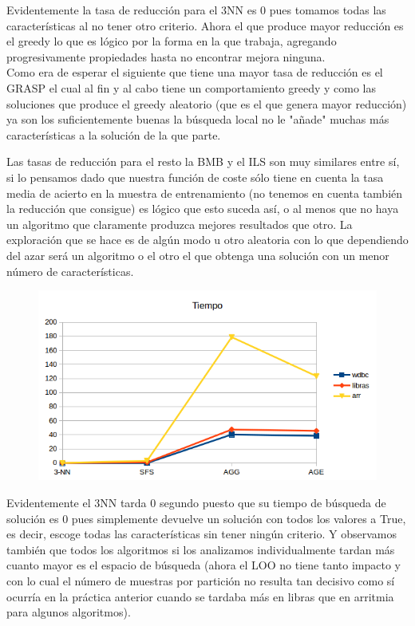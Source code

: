 \documentclass[10pt,a4paper]{article}
\begin{document}
Evidentemente la tasa de reducción para el 3NN es 0 pues tomamos todas las características al no tener otro criterio. Ahora el que produce mayor reducción es el greedy lo que es lógico por la forma en la que trabaja, agregando progresivamente propiedades hasta no encontrar mejora ninguna.\\

Como era de esperar el siguiente que tiene una mayor tasa de reducción es el GRASP el cual al fin y al cabo tiene un comportamiento greedy y como las soluciones que produce el greedy aleatorio (que es el que genera mayor reducción) ya son los suficientemente buenas la búsqueda local no le "añade" muchas más características a la solución de la que parte.

Las tasas de reducción para el resto la BMB y el ILS son muy similares entre sí, si lo pensamos dado que nuestra función de coste sólo tiene en cuenta la tasa media de acierto en la muestra de entrenamiento (no tenemos en cuenta también la reducción que consigue) es lógico que esto suceda así, o al menos que no haya un algoritmo que claramente produzca mejores resultados que otro. La exploración que se hace es de algún modo u otro aleatoria con lo que dependiendo del azar será un algoritmo o el otro el que obtenga una solución con un menor número de características.\\


\begin{figure}[H]
\centering
\includegraphics[width=130mm]{tiempo_ag.png}
\end{figure}


Evidentemente el 3NN tarda 0 segundo puesto que su tiempo de búsqueda de solución es 0 pues simplemente devuelve un solución con todos los valores a True, es decir, escoge todas las características sin tener ningún criterio. Y observamos también que todos los algoritmos si los analizamos individualmente tardan más cuanto mayor es el espacio de búsqueda (ahora el LOO no tiene tanto impacto y con lo cual el número de muestras por partición no resulta tan decisivo como sí ocurría en la práctica anterior cuando se tardaba más en libras que en arritmia para algunos algoritmos).\\
\end{document}
